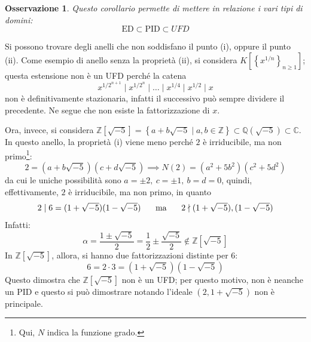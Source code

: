 \documentclass[11pt]{article}
\theoremstyle{style}
\newtheorem{osservazione}{Osservazione}[section]
\numberwithin{equation}{subsection}
\begin{document}
\begin{osservazione}
Questo corollario permette di mettere in relazione i vari tipi di domini:
\[
\text{ED} \subset \text{PID}\subset UFD
\] 
\end{osservazione}
\noindent Si possono trovare degli anelli che non soddisfano il punto (i), oppure il punto (ii).
Come esempio di anello senza la propriet\`a (ii), si considera $K[\left\{ x^{1 / n}  \right\} _{n\ge 1} ]$; questa estensione non \`e un UFD perch\'e la catena
\[
x^{1/2^{n+1} }  \mid x^{1 / 2^n}  \mid \ldots  \mid x^{1 / 4}  \mid x ^{ 1 / 2}   \mid  x
\] 
non \`e definitivamente stazionaria, infatti il successivo pu\`o sempre dividere il precedente.
Ne segue che non esiste la fattorizzazione di $x$.

Ora, invece, si considera $\mathbb{Z}[\sqrt{-5} ] = \left\{ a + b\sqrt{-5}  \mid a,b \in \mathbb{Z} \right\} \subset \mathbb{Q}(\sqrt{-5} ) \subset \mathbb{C}$.
In questo anello, la propriet\`a (i) viene meno perch\'e $2$ \`e irriducibile, ma non primo\footnote{Qui, $N$ indica la funzione grado.}:
\[
2 = (a + b\sqrt{-5} )(c+d\sqrt{-5} ) \implies N(2) = (a^2 + 5b^2 ) (c^2 + 5d^2)
\] 
da cui le uniche possibilit\`a sono $a = \pm 2, \ c= \pm 1, \ b = d = 0$, quindi, effettivamente, $2$ \`e irriducibile, ma non primo, in quanto 
\[
2  \mid 6 = (1 + \sqrt{-5} ) ( 1-\sqrt{-5} ) \hspace{.5cm} \text{ ma } \hspace{.5cm} 2 \nmid (1+\sqrt{-5} ) , (1-\sqrt{-5} )
\] 
Infatti:
\[
	\alpha  = \frac{1\pm\sqrt{-5} }{2} = \frac{1}{2} \pm \frac{\sqrt{-5} }{2}\not \in \mathbb{Z}[\sqrt{-5} ]
\] 
In $\mathbb{Z}[\sqrt{-5} ]$, allora, si hanno due fattorizzazioni distinte per $6$:
\[
6 = 2\cdot 3 = (1+\sqrt{-5} ) (1-\sqrt{-5} )
\] 
Questo dimostra che $\mathbb{Z}[\sqrt{-5} ]$ non \`e un UFD; per questo motivo, non \`e neanche un PID e questo si pu\`o dimostrare notando l'ideale $(2, 1+\sqrt{-5} )$ non \`e principale.
\end{document}

